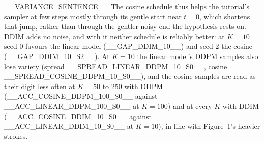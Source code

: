 __VARIANCE_SENTENCE__ The cosine schedule thus helps the tutorial's sampler at few steps mostly
through its gentle start near $t = 0$, which shortens that jump, rather than through the gentler
noisy end the hypothesis rests on. DDIM adds no noise, and with it neither schedule is reliably
better: at $K = 10$ seed 0 favours the linear model (__GAP_DDIM_10__) and seed 2 the cosine
(__GAP_DDIM_10_S2__). At $K = 10$ the linear model's DDPM samples also lose variety (spread
__SPREAD_LINEAR_DDPM_10_S0__, cosine __SPREAD_COSINE_DDPM_10_S0__), and the cosine samples are read
as their digit less often at $K = 50$ to 250 with DDPM (__ACC_COSINE_DDPM_100_S0__ against
__ACC_LINEAR_DDPM_100_S0__ at $K = 100$) and at every $K$ with DDIM (__ACC_COSINE_DDIM_10_S0__
against __ACC_LINEAR_DDIM_10_S0__ at $K = 10$), in line with Figure~1's heavier strokes.
